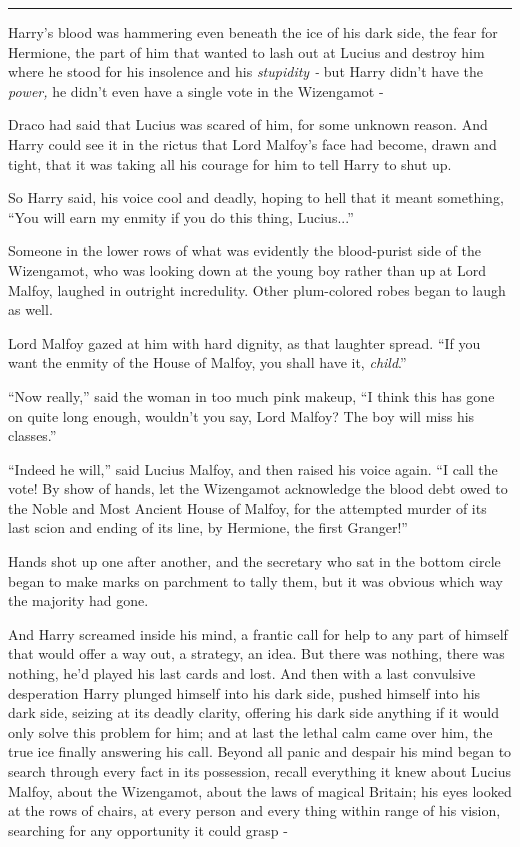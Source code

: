 \begin{center}\rule{3in}{0.4pt}\end{center}

Harry's blood was hammering even beneath the ice of his dark side, the fear for Hermione, the part of him that wanted to lash out at Lucius and destroy him where he stood for his insolence and his \emph{stupidity -} but Harry didn't have the \emph{power,} he didn't even have a single vote in the Wizengamot -

Draco had said that Lucius was scared of him, for some unknown reason. And Harry could see it in the rictus that Lord Malfoy's face had become, drawn and tight, that it was taking all his courage for him to tell Harry to shut up.

So Harry said, his voice cool and deadly, hoping to hell that it meant something, ``You will earn my enmity if you do this thing, Lucius...''

Someone in the lower rows of what was evidently the blood-purist side of the Wizengamot, who was looking down at the young boy rather than up at Lord Malfoy, laughed in outright incredulity. Other plum-colored robes began to laugh as well.

Lord Malfoy gazed at him with hard dignity, as that laughter spread. ``If you want the enmity of the House of Malfoy, you shall have it, \emph{child}.''

``Now really,'' said the woman in too much pink makeup, ``I think this has gone on quite long enough, wouldn't you say, Lord Malfoy? The boy will miss his classes.''

``Indeed he will,'' said Lucius Malfoy, and then raised his voice again. ``I call the vote! By show of hands, let the Wizengamot acknowledge the blood debt owed to the Noble and Most Ancient House of Malfoy, for the attempted murder of its last scion and ending of its line, by Hermione, the first Granger!''

Hands shot up one after another, and the secretary who sat in the bottom circle began to make marks on parchment to tally them, but it was obvious which way the majority had gone.

And Harry screamed inside his mind, a frantic call for help to any part of himself that would offer a way out, a strategy, an idea. But there was nothing, there was nothing, he'd played his last cards and lost. And then with a last convulsive desperation Harry plunged himself into his dark side, pushed himself into his dark side, seizing at its deadly clarity, offering his dark side anything if it would only solve this problem for him; and at last the lethal calm came over him, the true ice finally answering his call. Beyond all panic and despair his mind began to search through every fact in its possession, recall everything it knew about Lucius Malfoy, about the Wizengamot, about the laws of magical Britain; his eyes looked at the rows of chairs, at every person and every thing within range of his vision, searching for any opportunity it could grasp -
